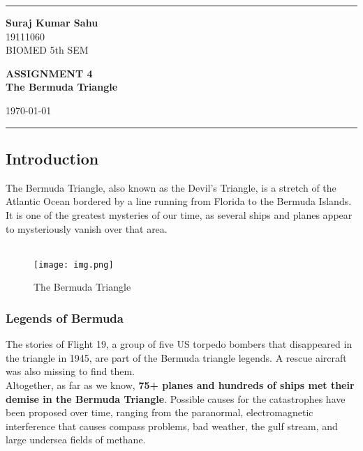 \documentclass[12pt,a4paper]{article}
\begin{document}
    
    \hrule \medskip %
    \begin{minipage}{0.3\textwidth}
    \raggedright
    \small
    \textbf{Suraj Kumar Sahu}
    \\
    19111060
    \\
    BIOMED 5th SEM
    
    \end{minipage}
    \begin{minipage}{0.45\textwidth} 
    \centering 
    \large 
    \textbf{ASSIGNMENT 4}\\
    \normalsize 
    \textbf{The Bermuda Triangle}\\ 
    \end{minipage}
    \begin{minipage}{0.2\textwidth}
    \raggedleft
    \today\hfill\\
    \end{minipage}
    \medskip\hrule 
    \bigskip

\subsection*{Introduction}
The Bermuda Triangle, also known as the Devil's Triangle, is a stretch of the Atlantic Ocean bordered by a line running from Florida to the Bermuda Islands. It is one of the greatest mysteries of our time, as several ships and planes appear to mysteriously vanish over that area. 
\\
\\
\begin{figure}[htp]
    \centering
    \texttt{[image: img.png]}
    \caption{The Bermuda Triangle}
    \label{fig:galaxy}
\end{figure}

\subsubsection*{Legends of Bermuda}
The stories of Flight 19, a group of five US torpedo bombers that disappeared in the triangle in 1945, are part of the Bermuda triangle legends. A rescue aircraft was also missing to find them.
\\
Altogether, as far as we know, \textbf{75+ planes and hundreds of ships met their demise in the Bermuda Triangle}. Possible causes for the catastrophes have been proposed over time, ranging from the paranormal, electromagnetic interference that causes compass problems, bad weather, the gulf stream, and large undersea fields of methane.
\end{document}
